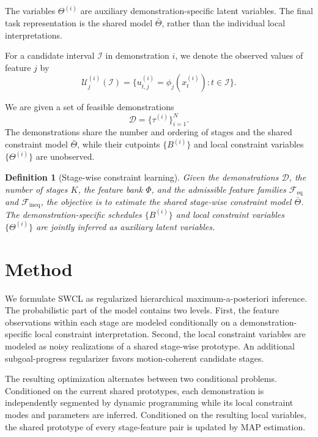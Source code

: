 \documentclass[lettersize,journal]{IEEEtran}
\newtheorem{definition}{Definition}
\begin{document}
The variables $\Theta^{(i)}$ are auxiliary demonstration-specific latent
variables. The final task representation is the shared model $\bar{\Theta}$,
rather than the individual local interpretations.

For a candidate interval $\mathcal{I}$ in demonstration $i$, we denote the
observed values of feature $j$ by
\begin{equation}
\mathcal{U}_j^{(i)}(\mathcal{I})
=
\{
u_{t,j}^{(i)}
=
\phi_j(x_t^{(i)})
:
t\in\mathcal{I}
\}.
\label{eq:interval_feature_samples_map}
\end{equation}

We are given a set of feasible demonstrations
\[
\mathcal{D}
=
\{
\tau^{(i)}
\}_{i=1}^{N}.
\]
The demonstrations share the number and ordering of stages and the shared
constraint model $\bar{\Theta}$, while their cutpoints
$\{B^{(i)}\}$ and local constraint variables
$\{\Theta^{(i)}\}$ are unobserved.

\begin{definition}[Stage-wise constraint learning]
Given the demonstrations $\mathcal{D}$, the number of stages $K$, the feature
bank $\Phi$, and the admissible feature families
$\mathcal{F}_{\mathrm{eq}}$ and $\mathcal{F}_{\mathrm{ineq}}$, the objective is
to estimate the shared stage-wise constraint model $\bar{\Theta}$.
The demonstration-specific schedules $\{B^{(i)}\}$ and local constraint
variables $\{\Theta^{(i)}\}$ are jointly inferred as auxiliary latent variables.
\end{definition}


\section{Method}
\label{sec:method}

We formulate SWCL as regularized hierarchical maximum-a-posteriori inference.
The probabilistic part of the model contains two levels. First, the feature
observations within each stage are modeled conditionally on a
demonstration-specific local constraint interpretation. Second, the local
constraint variables are modeled as noisy realizations of a shared stage-wise
prototype. An additional subgoal-progress regularizer favors motion-coherent
candidate stages.

The resulting optimization alternates between two conditional problems.
Conditioned on the current shared prototypes, each demonstration is independently
segmented by dynamic programming while its local constraint modes and parameters
are inferred. Conditioned on the resulting local variables, the shared prototype
of every stage-feature pair is updated by MAP estimation.
\end{document}
